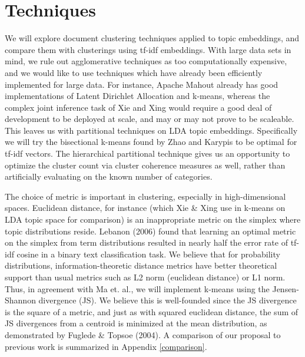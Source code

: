 \documentclass{sig-alternate-05-2015}
\begin{document}
\section{Techniques}
We will explore document clustering techniques applied to topic embeddings, and compare them with clusterings using tf-idf embeddings.  With large data sets in mind, we rule out agglomerative techniques as too computationally expensive, and we would like to use techniques which have already been efficiently implemented for large data.  For instance, Apache Mahout already has good implementations of Latent Dirichlet Allocation and k-means, whereas the complex joint inference task of Xie and Xing would require a good deal of development to be deployed at scale, and may or may not prove to be scaleable. This leaves us with partitional techniques on LDA topic embeddings. Specifically we will try the bisectional k-means found by Zhao and Karypis to be optimal for tf-idf vectors.  The hierarchical partitional technique gives us an opportunity to optimize the cluster count via cluster coherence measures as well, rather than artificially evaluating on the known number of categories.

The choice of metric is important in clustering, especially in high-dimensional spaces.  Euclidean distance, for instance (which Xie \& Xing use in k-means on LDA topic space for comparison) is an inappropriate metric on the simplex where topic distributions reside.  Lebanon (2006)\cite{learnedmetrics} found that learning an optimal metric on the simplex from term distributions resulted in nearly half the error rate of tf-idf cosine in a binary text classification task.  We believe that for probability distributions, information-theoretic distance metrics have better theoretical support than usual metrics such as L2 norm (euclidean distance) or L1 norm.  Thus, in agreement with Ma et. al., we will implement k-means using the Jensen-Shannon divergence (JS).  We believe this is well-founded since the JS divergence is the square of a metric, and just as with squared euclidean distance, the sum of JS divergences from a centroid is minimized at the mean distribution, as demonstrated by Fuglede \& Topsoe (2004)\cite{hilbertspace}. A comparison of our proposal to previous work is summarized in Appendix \ref{comparison}.
\end{document}
